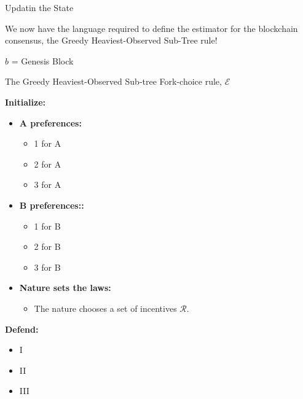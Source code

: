 \documentclass{article}
\begin{document}
 \begin{algorithm}[tbh]
 \caption{Updatin the State}
We now have the language required to define the estimator for the blockchain consensus, the Greedy Heaviest-Observed Sub-Tree rule!
\begin{defn}
\end{defn}

\begin{algorithm}[H]
 $b$ = Genesis Block


\caption{The Greedy Heaviest-Observed Sub-tree Fork-choice rule, $\mathcal{E}$}
\end{algorithm}
 \begin{algorithmic}
 \State  \bf{Initialize:} \normalfont 
    \begin{itemize}
        \item \bf{A preferences:} \normalfont 
            \begin{itemize}
                \item 1 for A
                \item 2 for A
                \item 3 for A
            \end{itemize}
        \item \bf{B preferences::} \normalfont
            \begin{itemize}
                \item 1 for B
                \item 2 for B
                \item 3 for B
            \end{itemize}
        \item \bf{Nature sets the laws:} \normalfont
            \begin{itemize}
                \item The nature chooses a set of incentives $\mathcal{R}$.
            \end{itemize}
    \end{itemize}
 \State  
 \State  
 \State \bf{Defend:} \normalfont 
    \begin{itemize}
        \item I
        \item II
        \item III
    \end{itemize}


\end{algorithmic}
\end{algorithm}
\end{document}
